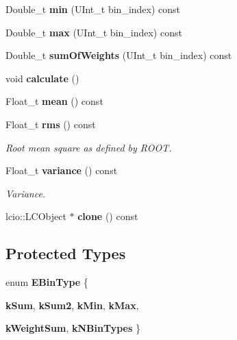 \begin{DoxyCompactItemize}
\item 
Double\_\-t {\bfseries min} (UInt\_\-t bin\_\-index) const \label{classhistmgr_1_1Profile1D_a5d07ca25d79482dd7d8d98178d746784}

\item 
Double\_\-t {\bfseries max} (UInt\_\-t bin\_\-index) const \label{classhistmgr_1_1Profile1D_af8406fba0e42d7c9ffcdcf66d5d193c5}

\item 
Double\_\-t {\bfseries sumOfWeights} (UInt\_\-t bin\_\-index) const \label{classhistmgr_1_1Profile1D_ac62849819ee902dffddb7aebc7536691}

\item 
void {\bfseries calculate} ()\label{classhistmgr_1_1Profile1D_ac1fc5c2662bcab8be68b5e3a5b388453}

\item 
Float\_\-t {\bfseries mean} () const \label{classhistmgr_1_1Profile1D_af5aa05e5008c1c1bae8f2c4bba9dd904}

\item 
Float\_\-t {\bf rms} () const 
\begin{DoxyCompactList}\small\item\em Root mean square as defined by ROOT. \item\end{DoxyCompactList}\item 
Float\_\-t {\bf variance} () const 
\begin{DoxyCompactList}\small\item\em Variance. \item\end{DoxyCompactList}\item 
lcio::LCObject $\ast$ {\bfseries clone} () const \label{classhistmgr_1_1Profile1D_a23277a8a779ce572ed770317146bc7ae}

\end{DoxyCompactItemize}
\subsection*{Protected Types}
\begin{DoxyCompactItemize}
\item 
enum {\bfseries EBinType} \{ \par
{\bfseries kSum}, 
{\bfseries kSum2}, 
{\bfseries kMin}, 
{\bfseries kMax}, 
\par
{\bfseries kWeightSum}, 
{\bfseries kNBinTypes}
 \}
\end{DoxyCompactItemize}

